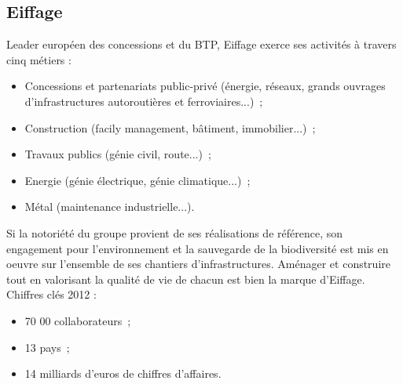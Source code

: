     \subsection{Eiffage}
    	Leader européen des concessions et du BTP, Eiffage exerce ses activités à travers cinq métiers :
        \begin{itemize}
        	\item Concessions et partenariats public-privé (énergie, réseaux, grands ouvrages d'infrastructures autoroutières et ferroviaires...)~;
        	\item Construction (facily management, bâtiment, immobilier...)~;
        	\item Travaux publics (génie civil, route...)~;
        	\item Energie (génie électrique, génie climatique...)~;
        	\item Métal (maintenance industrielle...).
        \end{itemize}
        \bigbreak
        	Si la notoriété du groupe provient de ses réalisations de référence, son engagement pour l'environnement et la sauvegarde de la biodiversité est mis en oeuvre sur l'ensemble de ses chantiers d'infrastructures. Aménager et construire tout en valorisant la qualité de vie de chacun est bien la marque d'Eiffage.
        \bigbreak
        Chiffres clés 2012 :
        \begin{itemize}
        	\item 70 00 collaborateurs~;
        	\item 13 pays~;
        	\item 14 milliards d'euros de chiffres d'affaires.
        \end{itemize}


